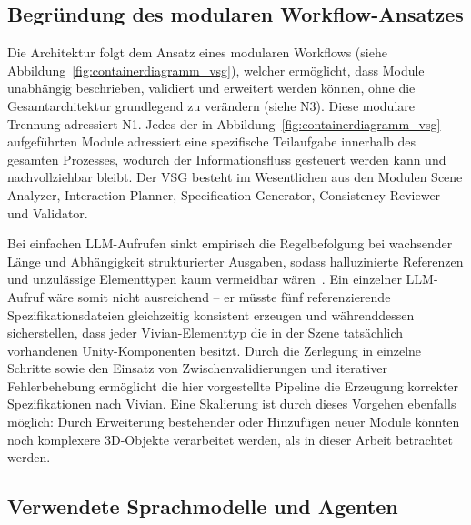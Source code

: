 \subsection{Begründung des modularen Workflow-Ansatzes}

Die Architektur folgt dem Ansatz eines modularen Workflows (siehe Abbildung~\ref{fig:containerdiagramm_vsg}), welcher ermöglicht, dass Module unabhängig beschrieben, validiert und erweitert werden können, ohne die Gesamtarchitektur grundlegend zu verändern (siehe N3).
Diese modulare Trennung adressiert N1.
Jedes der in Abbildung~\ref{fig:containerdiagramm_vsg} aufgeführten Module adressiert eine spezifische Teilaufgabe innerhalb des gesamten Prozesses, wodurch der Informationsfluss gesteuert werden kann und nachvollziehbar bleibt.
Der VSG besteht im Wesentlichen aus den Modulen Scene Analyzer, Interaction Planner, Specification Generator, Consistency Reviewer und Validator.

Bei einfachen LLM-Aufrufen sinkt empirisch die Regelbefolgung bei wachsender Länge und Abhängigkeit strukturierter Ausgaben, sodass halluzinierte Referenzen und unzulässige Elementtypen kaum vermeidbar wären~\cite{zhangLostintheMiddleLongTextGeneration2025}.
Ein einzelner LLM-Aufruf wäre somit nicht ausreichend -- er müsste fünf referenzierende Spezifikationsdateien gleichzeitig konsistent erzeugen und währenddessen sicherstellen, dass jeder Vivian-Elementtyp die in der Szene tatsächlich vorhandenen Unity-Komponenten besitzt.
Durch die Zerlegung in einzelne Schritte sowie den Einsatz von Zwischenvalidierungen und iterativer Fehlerbehebung ermöglicht die hier vorgestellte Pipeline die Erzeugung korrekter Spezifikationen nach Vivian.
Eine Skalierung ist durch dieses Vorgehen ebenfalls möglich: Durch Erweiterung bestehender oder Hinzufügen neuer Module könnten noch komplexere 3D-Objekte verarbeitet werden, als in dieser Arbeit betrachtet werden.

\subsection{Verwendete Sprachmodelle und Agenten}


